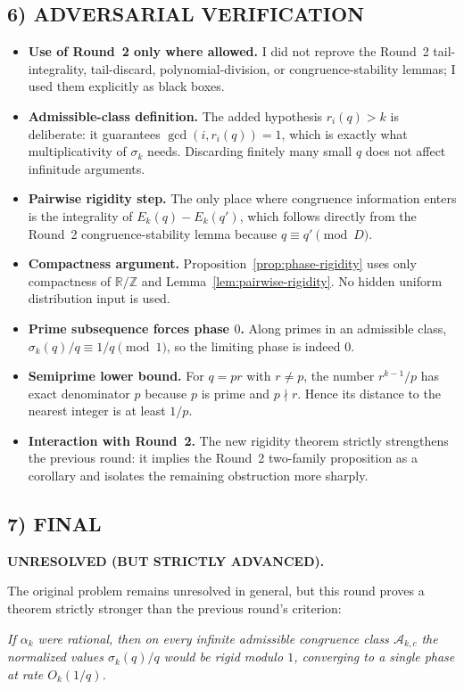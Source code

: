 \subsection*{6) ADVERSARIAL VERIFICATION}
\begin{itemize}
\item \textbf{Use of Round~2 only where allowed.} I did not reprove the Round~2 tail-integrality, tail-discard, polynomial-division, or congruence-stability lemmas; I used them explicitly as black boxes.
\item \textbf{Admissible-class definition.} The added hypothesis $r_i(q)>k$ is deliberate: it guarantees $\gcd(i,r_i(q))=1$, which is exactly what multiplicativity of $\sigma_k$ needs. Discarding finitely many small $q$ does not affect infinitude arguments.
\item \textbf{Pairwise rigidity step.} The only place where congruence information enters is the integrality of $E_k(q)-E_k(q')$, which follows directly from the Round~2 congruence-stability lemma because $q\equiv q'\pmod D$.
\item \textbf{Compactness argument.} Proposition~\ref{prop:phase-rigidity} uses only compactness of $\mathbb{R}/\mathbb{Z}$ and Lemma~\ref{lem:pairwise-rigidity}. No hidden uniform distribution input is used.
\item \textbf{Prime subsequence forces phase $0$.} Along primes in an admissible class, $\sigma_k(q)/q\equiv1/q\pmod 1$, so the limiting phase is indeed $0$.
\item \textbf{Semiprime lower bound.} For $q=pr$ with $r\ne p$, the number $r^{k-1}/p$ has exact denominator $p$ because $p$ is prime and $p\nmid r$. Hence its distance to the nearest integer is at least $1/p$.
\item \textbf{Interaction with Round~2.} The new rigidity theorem strictly strengthens the previous round: it implies the Round~2 two-family proposition as a corollary and isolates the remaining obstruction more sharply.
\end{itemize}

\subsection*{7) FINAL}
\textbf{UNRESOLVED (BUT STRICTLY ADVANCED).}

The original problem remains unresolved in general, but this round proves a theorem strictly stronger than the previous round's criterion:

\medskip
\noindent
\emph{If $\alpha_k$ were rational, then on every infinite admissible congruence class $\mathcal{A}_{k,c}$ the normalized values $\sigma_k(q)/q$ would be rigid modulo $1$, converging to a single phase at rate $O_k(1/q)$.}

